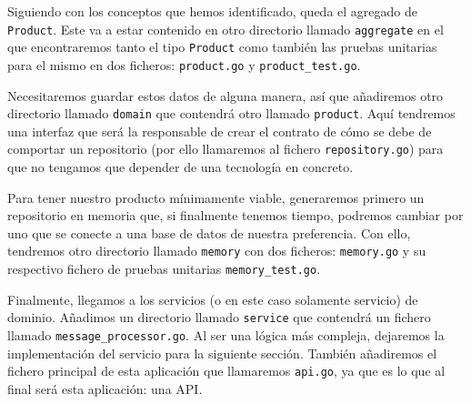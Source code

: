 Siguiendo con los conceptos que hemos identificado, queda el agregado de 
\verb|Product|. Este va a estar contenido en otro directorio llamado 
\verb|aggregate| en el que encontraremos tanto el tipo \verb|Product| como también 
las pruebas unitarias para el mismo en dos ficheros: \verb|product.go| y 
\verb|product_test.go|.

Necesitaremos guardar estos datos de alguna manera, así que añadiremos otro 
directorio llamado \verb|domain| que contendrá otro llamado \verb|product|. Aquí 
tendremos una interfaz que será la responsable de crear el contrato de cómo se debe 
de comportar un repositorio (por ello llamaremos al fichero \verb|repository.go|) 
para que no tengamos que depender de una tecnología en concreto. 

Para tener nuestro producto mínimamente viable, generaremos primero un repositorio 
en memoria que, si finalmente tenemos tiempo, podremos cambiar por uno que se 
conecte a una base de datos de nuestra preferencia. Con ello, tendremos otro  
directorio llamado \verb|memory| con dos ficheros: \verb|memory.go| y su respectivo 
fichero de pruebas unitarias \verb|memory_test.go|.

Finalmente, llegamos a los servicios (o en este caso solamente servicio) de 
dominio. Añadimos un directorio llamado \verb|service| que contendrá un fichero 
llamado \verb|message_processor.go|. Al ser una lógica más compleja, dejaremos la 
implementación del servicio para la siguiente sección. También añadiremos el 
fichero principal de esta aplicación que llamaremos \verb|api.go|, ya que es lo que 
al final será esta aplicación: una API.
